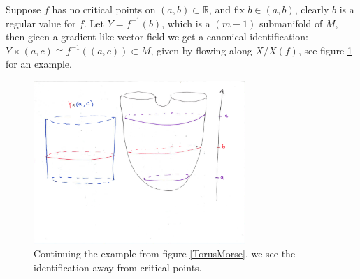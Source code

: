 \documentclass{article}
\newtheorem{proposed work}[theorem]{Proposed Work}
\theoremstyle{definition}
\begin{document}
Suppose $f$ has no critical points on $(a,b)\subset \mathbb{R}$, and fix $b\in (a,b)$, clearly $b$ is a regular value for $f$. Let $Y=f^{-1}(b)$, which is a $(m-1)$ submanifold of $M$, then gicen a gradient-like vector field we get a canonical identification: $Y\times (a,c)\cong f^{-1}((a,c))\subset M$, given by flowing along $X/X(f)$, see figure \ref{nocritpt} for an example.
\begin{figure}[h]
\includegraphics[width=8cm]{nocritpt.pdf}
\caption{Continuing the example from figure \ref{TorusMorse}, we see the identification away from critical points. \label{nocritpt}}
\end{figure}
\end{document}
